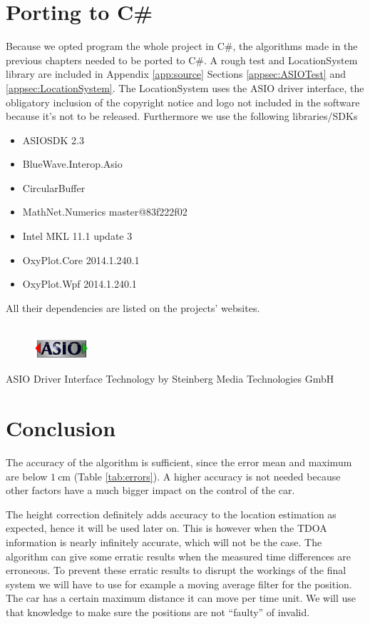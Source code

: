 \documentclass[final]{scrreprt} %
\begin{document}
\section{Porting to C\#}
Because we opted program the whole project in C\#, the algorithms made in the previous chapters needed to be ported to C\#.
A rough test and LocationSystem library are included in Appendix \ref{app:source} Sections \ref{appsec:ASIOTest} and \ref{appsec:LocationSystem}.
The LocationSystem uses the ASIO driver interface, the obligatory inclusion of the copyright notice and logo not included in the software because it's not to be released.
Furthermore we use the following libraries/SDKs
\begin{itemize}
\item ASIOSDK 2.3
\item BlueWave.Interop.Asio
\item CircularBuffer
\item MathNet.Numerics master@83f222f02
\item Intel MKL 11.1 update 3
\item OxyPlot.Core 2014.1.240.1
\item OxyPlot.Wpf 2014.1.240.1
\end{itemize}
All their dependencies are listed on the projects' websites.
\\ \\
\begin{figure}[h]
	\includegraphics[width=2cm]{resources/ASIO_LOGO1.jpg}
\end{figure}
ASIO Driver Interface Technology by Steinberg Media Technologies GmbH

\section{Conclusion}
The accuracy of the algorithm is sufficient, since the error mean and maximum are below $\SI{1}{\centi\meter}$ (Table \ref{tab:errors}).
A higher accuracy is not needed because other factors have a much bigger impact on the control of the car.

The height correction definitely adds accuracy to the location estimation as expected, hence it will be used later on.
This is however when the TDOA information is nearly infinitely accurate, which will not be the case.
The algorithm can give some erratic results when the measured time differences are erroneous.
To prevent these erratic results to disrupt the workings of the final system we will have to use for example a moving average filter for the position.
The car has a certain maximum distance it can move per time unit. We will use that knowledge to make sure the positions are not ``faulty'' of invalid.
\end{document}
